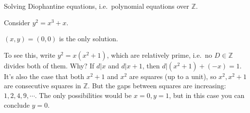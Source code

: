 Solving Diophantine equations, i.e.~polynomial equations over
\({\mathbb{Z}}\).

\begin{example}[?]

Consider \(y^2 = x^3 + x\).

\begin{claim}

\((x, y) = (0, 0)\) is the only solution.

\end{claim}

To see this, write \(y^2 = x(x^2+1)\), which are relatively prime,
i.e.~no \(D\in {\mathbb{Z}}\) divides both of them. Why? If
\(d \mathrel{\Big|}x\) and \(d \mathrel{\Big|}x+1\), then
\(d\mathrel{\Big|}(x^2+1) + (-x) = 1\). It's also the case that both
\(x^2+1\) and \(x^2\) are squares (up to a unit), so \(x^2, x^2 + 1\)
are consecutive squares in \({\mathbb{Z}}\). But the gaps between
squares are increasing: \(1, 2, 4, 9, \cdots\). The only possibilities
would be \(x=0, y=1\), but in this case you can conclude \(y=0\).

\end{example}

